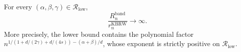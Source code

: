 For every \((\alpha,\beta,\gamma)\in\mathcal{R}_{\mathrm{low}}\), \[\frac{R_n^{\mathrm{band}}}{r_n^{\mathrm{KBRW}}}\longrightarrow\infty.\] More precisely, the lower bound contains the polynomial factor \(n^{1/(1+d/(2\gamma)+d/(4s))-(\alpha+\beta)/d}\), whose exponent is strictly positive on \(\mathcal{R}_{\mathrm{low}}\).